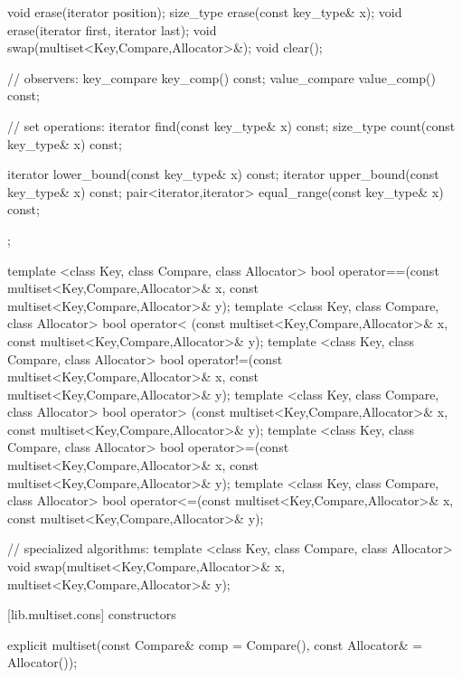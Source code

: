 \begin{codeblock}
{{    void      erase(iterator position);
    size_type erase(const key_type& x);
    void      erase(iterator first, iterator last);
    void swap(multiset<Key,Compare,Allocator>&);
    void clear();

    // observers:
    key_compare   key_comp() const;
    value_compare value_comp() const;

    // set operations:
    iterator  find(const key_type& x) const;
    size_type count(const key_type& x) const;

    iterator  lower_bound(const key_type& x) const;
    iterator  upper_bound(const key_type& x) const;
    pair<iterator,iterator> equal_range(const key_type& x) const;
  };

  template <class Key, class Compare, class Allocator>
    bool operator==(const multiset<Key,Compare,Allocator>& x,
                    const multiset<Key,Compare,Allocator>& y);
  template <class Key, class Compare, class Allocator>
    bool operator< (const multiset<Key,Compare,Allocator>& x,
                    const multiset<Key,Compare,Allocator>& y);
  template <class Key, class Compare, class Allocator>
    bool operator!=(const multiset<Key,Compare,Allocator>& x,
                    const multiset<Key,Compare,Allocator>& y);
  template <class Key, class Compare, class Allocator>
    bool operator> (const multiset<Key,Compare,Allocator>& x,
                    const multiset<Key,Compare,Allocator>& y);
  template <class Key, class Compare, class Allocator>
    bool operator>=(const multiset<Key,Compare,Allocator>& x,
                    const multiset<Key,Compare,Allocator>& y);
  template <class Key, class Compare, class Allocator>
    bool operator<=(const multiset<Key,Compare,Allocator>& x,
                    const multiset<Key,Compare,Allocator>& y);

  // specialized algorithms:
  template <class Key, class Compare, class Allocator>
    void swap(multiset<Key,Compare,Allocator>& x,
              multiset<Key,Compare,Allocator>& y);
}
\end{codeblock}%
%

[lib.multiset.cons]{ constructors}

%
%
\begin{itemdecl}
explicit multiset(const Compare& comp = Compare(),
                  const Allocator& = Allocator());
\end{itemdecl}


